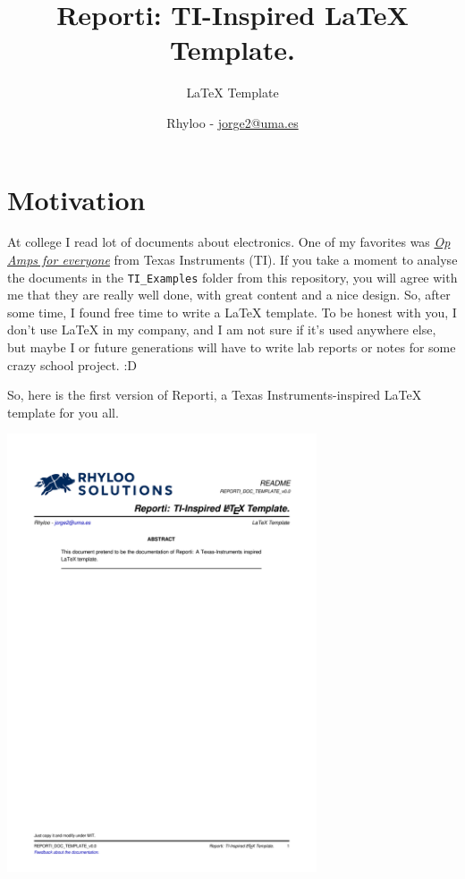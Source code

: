 \documentclass{reporti}
\date{}
\title{Reporti: TI-Inspired \LaTeX{} Template.}
\begin{document}
\subtitle{LaTeX Template}
\author{Rhyloo - \href{mailto:jorge2@uma.es}{jorge2@uma.es}}


\summary{}


\cover[width=1.35\textwidth][continue]



\section{Motivation}
\label{sec:org3e5338d}
At college I read lot of documents about electronics. One of my favorites was \emph{\href{https://e2echina.ti.com/cfs-file/\_\_key/telligent-evolution-components-attachments/00-52-01-00-00-04-59-46/OP-amp-for-everyone.pdf}{Op Amps for everyone}} from Texas Instruments (TI). If you take a moment to analyse the documents in the \texttt{TI\_Examples} folder from this repository, you will agree with me that they are really well done, with great content and a nice design. So, after some time, I found free time to write a \LaTeX{} template. To be honest with you, I don't use \LaTeX{} in my company, and I am not sure if it's used anywhere else, but maybe I or future generations will have to write lab reports or notes for some crazy school project. :D

So, here is the first version of Reporti, a Texas Instruments-inspired \LaTeX{} template for you all.

\begin{center}
\includegraphics[fbox,height=35em]{./README.pdf}
\end{center}
\end{document}
